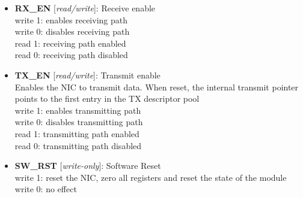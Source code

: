 \vspace{12pt}
\noindent
{}

\begin{itemize}
\item \begin{small}
{\bf 
RX\_EN
} [\emph{read/write}]: Receive enable
\\
write 1: enables receiving path \\                        write 0: disables receiving path \\                        read 1: receiving path enabled \\                        read 0: receiving path disabled
\end{small}
\item \begin{small}
{\bf 
TX\_EN
} [\emph{read/write}]: Transmit enable
\\
Enables the NIC to transmit data. When reset, the internal transmit pointer points to the first entry in the TX descriptor pool \\                        write 1: enables transmitting path \\                        write 0: disables transmitting path \\                        read 1: transmitting path enabled \\                        read 0: transmitting path disabled
\end{small}
\item \begin{small}
{\bf 
SW\_RST
} [\emph{write-only}]: Software Reset
\\
write 1: reset the NIC, zero all registers and reset the state of the module \\                       write 0: no effect
\end{small}
\end{itemize}
